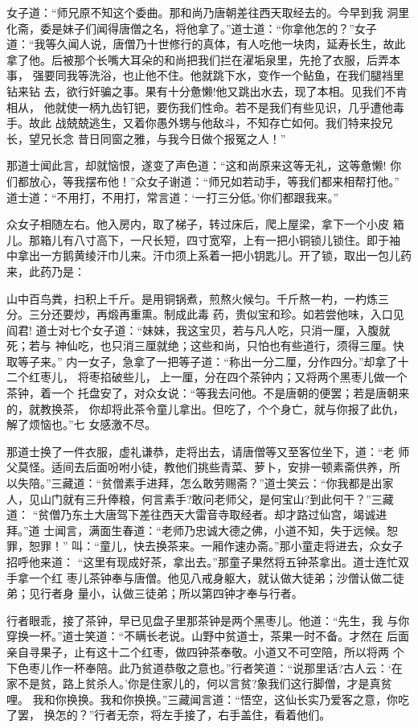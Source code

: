 女子道：“师兄原不知这个委曲。那和尚乃唐朝差往西天取经去的。今早到我
洞里化斋，委是妹子们闻得唐僧之名，将他拿了。”道士道：“你拿他怎的？”女子
道：“我等久闻人说，唐僧乃十世修行的真体，有人吃他一块肉，延寿长生，故此
拿了他。后被那个长嘴大耳朵的和尚把我们拦在濯垢泉里，先抢了衣服，后弄本事，
强要同我等洗浴，也止他不住。他就跳下水，变作一个鲇鱼，在我们腿裆里钻来钻
去，欲行奸骗之事。果有十分惫懒!他又跳出水去，现了本相。见我们不肯相从，
他就使一柄九齿钉钯，要伤我们性命。若不是我们有些见识，几乎遭他毒手。故此
战兢兢逃生，又着你愚外甥与他敌斗，不知存亡如何。我们特来投兄长，望兄长念
昔日同窗之雅，与我今日做个报冤之人！”

那道士闻此言，却就恼恨，遂变了声色道：“这和尚原来这等无礼，这等惫懒!
你们都放心，等我摆布他！”众女子谢道：“师兄如若动手，等我们都来相帮打他。”
道士道：“不用打，不用打，常言道：‘一打三分低。’你们都跟我来。”

众女子相随左右。他入房内，取了梯子，转过床后，爬上屋梁，拿下一个小皮
箱儿。那箱儿有八寸高下，一尺长短，四寸宽窄，上有一把小铜锁儿锁住。即于袖
中拿出一方鹅黄绫汗巾儿来。汗巾须上系着一把小钥匙儿。开了锁，取出一包儿药
来，此药乃是：

山中百鸟粪，扫积上千斤。是用铜锅煮，煎熬火候匀。千斤熬一杓，一杓炼三
分。三分还要炒，再煅再重熏。制成此毒
药，贵似宝和珍。如若尝他味，入口见阎君!
道士对七个女子道：“妹妹，我这宝贝，若与凡人吃，只消一厘，入腹就死；若与
神仙吃，也只消三厘就绝；这些和尚，只怕也有些道行，须得三厘。快取等子来。”
内一女子，急拿了一把等子道：“称出一分二厘，分作四分。”却拿了十二个红枣儿，
将枣掐破些儿，上一厘，分在四个茶钟内；又将两个黑枣儿做一个茶钟，着一个
托盘安了，对众女说：“等我去问他。不是唐朝的便罢；若是唐朝来的，就教换茶，
你却将此茶令童儿拿出。但吃了，个个身亡，就与你报了此仇，解了烦恼也。”七
女感激不尽。

那道士换了一件衣服，虚礼谦恭，走将出去，请唐僧等又至客位坐下，道：“老
师父莫怪。适间去后面吩咐小徒，教他们挑些青菜、萝卜，安排一顿素斋供养，所
以失陪。”三藏道：“贫僧素手进拜，怎么敢劳赐斋？”道士笑云：“你我都是出家
人，见山门就有三升俸粮，何言素手?敢问老师父，是何宝山?到此何干？”三藏道：
“贫僧乃东土大唐驾下差往西天大雷音寺取经者。却才路过仙宫，竭诚进拜。”道
士闻言，满面生春道：“老师乃忠诚大德之佛，小道不知，失于远候。恕罪，恕罪！”
叫：“童儿，快去换茶来。一厢作速办斋。”那小童走将进去，众女子招呼他来道：
“这里有现成好茶，拿出去。”那童子果然将五钟茶拿出。道士连忙双手拿一个红
枣儿茶钟奉与唐僧。他见八戒身躯大，就认做大徒弟；沙僧认做二徒弟；见行者身
量小，认做三徒弟；所以第四钟才奉与行者。

行者眼乖，接了茶钟，早已见盘子里那茶钟是两个黑枣儿。他道：“先生，我
与你穿换一杯。”道士笑道：“不瞒长老说。山野中贫道士，茶果一时不备。才然在
后面亲自寻果子，止有这十二个红枣，做四钟茶奉敬。小道又不可空陪，所以将两
个下色枣儿作一杯奉陪。此乃贫道恭敬之意也。”行者笑道：“说那里话?古人云：‘在
家不是贫，路上贫杀人。’你是住家儿的，何以言贫?象我们这行脚僧，才是真贫哩。
我和你换换。我和你换换。”三藏闻言道：“悟空，这仙长实乃爱客之意，你吃了罢，
换怎的？”行者无奈，将左手接了，右手盖住，看着他们。

